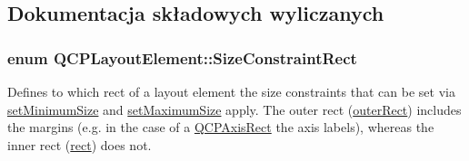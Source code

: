 \subsection{Dokumentacja składowych wyliczanych}
\subsubsection[{\texorpdfstring{Size\+Constraint\+Rect}{SizeConstraintRect}}]{\setlength{\rightskip}{0pt plus 5cm}enum {\bf Q\+C\+P\+Layout\+Element\+::\+Size\+Constraint\+Rect}}\hypertarget{class_q_c_p_layout_element_a0afb3e5773529e4bd20e448f81be4d2a}{}\label{class_q_c_p_layout_element_a0afb3e5773529e4bd20e448f81be4d2a}
Defines to which rect of a layout element the size constraints that can be set via \hyperlink{class_q_c_p_layout_element_a5dd29a3c8bc88440c97c06b67be7886b}{set\+Minimum\+Size} and \hyperlink{class_q_c_p_layout_element_a74eb5280a737ab44833d506db65efd95}{set\+Maximum\+Size} apply. The outer rect (\hyperlink{class_q_c_p_layout_element_a60bbddee2d1230c2414bd776f44d17b8}{outer\+Rect}) includes the margins (e.\+g. in the case of a \hyperlink{class_q_c_p_axis_rect}{Q\+C\+P\+Axis\+Rect} the axis labels), whereas the inner rect (\hyperlink{class_q_c_p_layout_element_affdfea003469aac3d0fac5f4e06171bc}{rect}) does not.

